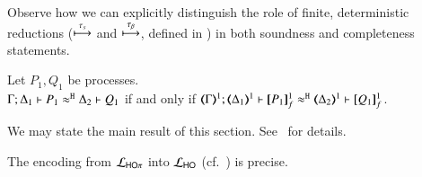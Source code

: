 \documentclass[runningheads]{llncs}
\begin{document}
{\begin{proposition}
\begin{enumerate}[1.]
\begin{enumerate}[a)]
			\end{enumerate}
		    
	\end{enumerate}
\end{proposition}

Observe how we can explicitly distinguish the role of finite, deterministic reductions 
($\stackrel{\tau_{s}}{\longmapsto}$ and $\stackrel{\tau_{\beta}}{\longmapsto}$, defined in ) in both soundness and completeness statements.

\begin{proposition}%
	\label{prop:fulla_HOp_to_HO}
	Let $P_1, Q_1$ be \HOp processes. \\
	$\Gamma; \Delta_1 \vdash P_1 \approx^\mathtt{H} \Delta_2 \vdash Q_1$
	if and only if
	$\horel{\tmap{\Gamma}{1}}{\tmap{\Delta_1}{1}}{\pmapp{P_1}{1}{f}}{\hwb}{\tmap{\Delta_2}{1}}{\pmapp{Q_1}{1}{f}}$.
\end{proposition}




We may state the main result of this section. See~\cite{KouzapasPY15} for details. 

\begin{theorem}
\label{f:enc:hopitoho}
The encoding from $\mathcal{L}_{\mathsf{HO}\pi}$ into $\mathcal{L}_{\mathsf{HO}}$ (cf.~)
is precise. 
\end{theorem}


}
\end{document}
